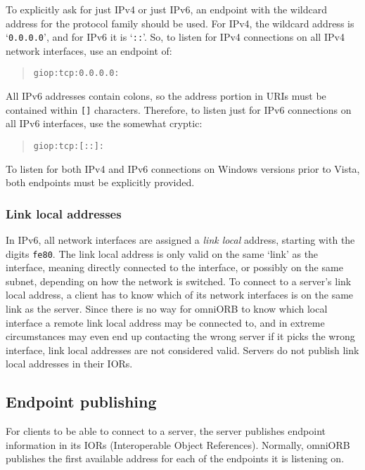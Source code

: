 \documentclass[11pt,twoside,a4paper]{book}
\newcommand{\code}[1]{\texttt{#1}}
\newcommand{\term}[1]{\textit{#1}}
\begin{document}
To explicitly ask for just IPv4 or just IPv6, an endpoint with the
wildcard address for the protocol family should be used. For IPv4, the
wildcard address is `\code{0.0.0.0}', and for IPv6 it is `\code{::}'.
So, to listen for IPv4 connections on all IPv4 network interfaces, use
an endpoint of:

\begin{quote}
\code{giop:tcp:0.0.0.0:}
\end{quote}

\noindent All IPv6 addresses contain colons, so the address portion in
URIs must be contained within \code{[]} characters. Therefore, to
listen just for IPv6 connections on all IPv6 interfaces, use the
somewhat cryptic:

\begin{quote}
\code{giop:tcp:[::]:}
\end{quote}

\noindent To listen for both IPv4 and IPv6 connections on Windows
versions prior to Vista, both endpoints must be explicitly provided.

\subsubsection{Link local addresses}

In IPv6, all network interfaces are assigned a \term{link local}
address, starting with the digits \code{fe80}. The link local address
is only valid on the same `link' as the interface, meaning directly
connected to the interface, or possibly on the same subnet, depending
on how the network is switched. To connect to a server's link local
address, a client has to know which of its network interfaces is on
the same link as the server. Since there is no way for omniORB to know
which local interface a remote link local address may be connected to,
and in extreme circumstances may even end up contacting the wrong
server if it picks the wrong interface, link local addresses are not
considered valid. Servers do not publish link local addresses in their
IORs.


\subsection{Endpoint publishing}

For clients to be able to connect to a server, the server publishes
endpoint information in its IORs (Interoperable Object References).
Normally, omniORB publishes the first available address for each of
the endpoints it is listening on.
\end{document}
